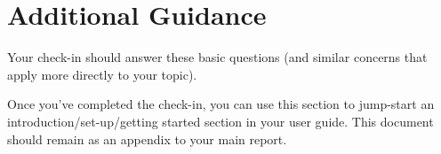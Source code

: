 \documentclass[
  letterpaper,
  DIV=11,
  numbers=noendperiod]{scrreprt}
\begin{document}
\section{Additional Guidance}\label{additional-guidance}

Your check-in should answer these basic questions (and similar concerns
that apply more directly to your topic).

Once you've completed the check-in, you can use this section to
jump-start an introduction/set-up/getting started section in your user
guide. This document should remain as an appendix to your main report.
\end{document}
